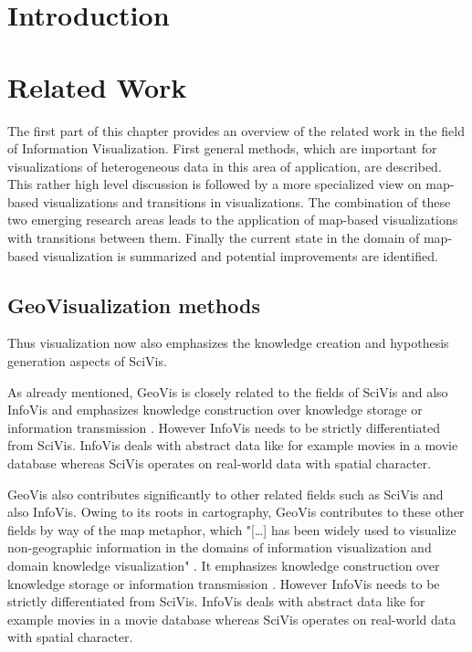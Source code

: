 \section{Introduction}

\section{Related Work}
The first part of this chapter provides an overview of the related work in the field of
Information Visualization. First general methods, which are important for visualizations of heterogeneous data in this area of application, are described. This rather high level discussion is followed by a more specialized view on map-based visualizations and transitions in visualizations. The combination of these two emerging research areas leads to the application of map-based visualizations with transitions between them. Finally the current state in the domain of map-based visualization is summarized and potential improvements are identified.

\subsection{GeoVisualization methods}
 Thus visualization now also emphasizes the knowledge creation and hypothesis generation aspects of \ac{SciVis}.

As already mentioned, \ac{GeoVis} is closely related to the fields of \ac{SciVis} and also \ac{InfoVis} and emphasizes knowledge construction over knowledge storage or information transmission . However \ac{InfoVis} needs to be strictly differentiated from \ac{SciVis}. \ac{InfoVis} deals with abstract data like for example movies in a movie database whereas \ac{SciVis} operates on real-world data with spatial character.

\ac{GeoVis} also contributes significantly to other related fields such as \ac{SciVis} and also \ac{InfoVis}. Owing to its roots in cartography, \ac{GeoVis} contributes to these other fields by way of the map metaphor, which "[\ldots] has been widely used to visualize non-geographic information in the domains of information visualization and domain knowledge visualization" . It emphasizes knowledge construction over knowledge storage or information transmission . However \ac{InfoVis} needs to be strictly differentiated from \ac{SciVis}. \ac{InfoVis} deals with abstract data like for example movies in a movie database whereas \ac{SciVis} operates on real-world data with spatial character.

